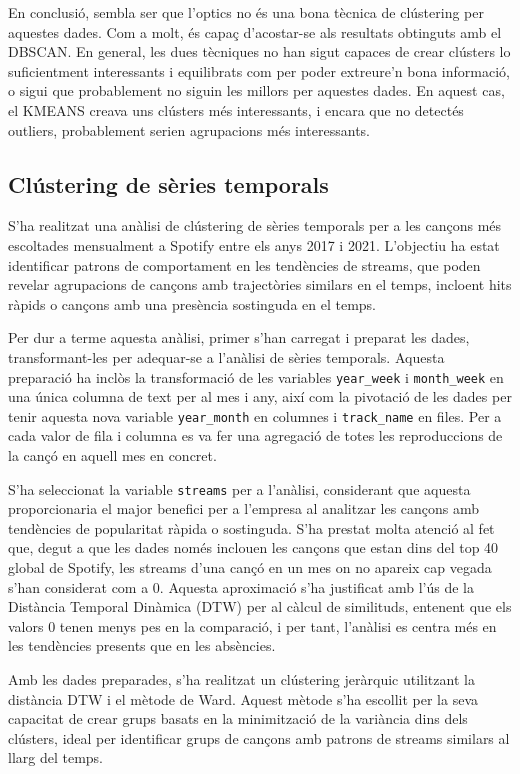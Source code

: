 \documentclass{article}
\begin{document}
En conclusió, sembla ser que l'optics no és una bona tècnica de clústering per aquestes dades. Com a molt, és capaç d'acostar-se als resultats obtinguts amb el DBSCAN. En general, les dues tècniques no han sigut capaces de crear clústers lo suficientment interessants i equilibrats com per poder extreure'n bona informació, o sigui que probablement no siguin les millors per aquestes dades. En aquest cas, el KMEANS creava uns clústers més interessants, i encara que no detectés outliers, probablement serien agrupacions més interessants.


\subsection{Clústering de sèries temporals}

S'ha realitzat una anàlisi de clústering de sèries temporals per a les cançons més escoltades mensualment a Spotify entre els anys 2017 i 2021. L'objectiu ha estat identificar patrons de comportament en les tendències de streams, que poden revelar agrupacions de cançons amb trajectòries similars en el temps, incloent hits ràpids o cançons amb una presència sostinguda en el temps.

Per dur a terme aquesta anàlisi, primer s'han carregat i preparat les dades, transformant-les per adequar-se a l'anàlisi de sèries temporals. Aquesta preparació ha inclòs la transformació de les variables \texttt{year\_week} i \texttt{month\_week} en una única columna de text per al mes i any, així com la pivotació de les dades per tenir aquesta nova variable \texttt{year\_month} en columnes i \texttt{track\_name} en files. Per a cada valor de fila i columna es va fer una agregació de totes les reproduccions de la cançó en aquell mes en concret.

S'ha seleccionat la variable \texttt{streams} per a l'anàlisi, considerant que aquesta proporcionaria el major benefici per a l'empresa al analitzar les cançons amb tendències de popularitat ràpida o sostinguda. S'ha prestat molta atenció al fet que, degut a que les dades només inclouen les cançons que estan dins del top 40 global de Spotify, les streams d'una cançó en un mes on no apareix cap vegada s'han considerat com a 0. Aquesta aproximació s'ha justificat amb l'ús de la Distància Temporal Dinàmica (DTW) per al càlcul de similituds, entenent que els valors 0 tenen menys pes en la comparació, i per tant, l'anàlisi es centra més en les tendències presents que en les absències.

Amb les dades preparades, s'ha realitzat un clústering jeràrquic utilitzant la distància DTW i el mètode de Ward. Aquest mètode s'ha escollit per la seva capacitat de crear grups basats en la minimització de la variància dins dels clústers, ideal per identificar grups de cançons amb patrons de streams similars al llarg del temps. 
\end{document}
